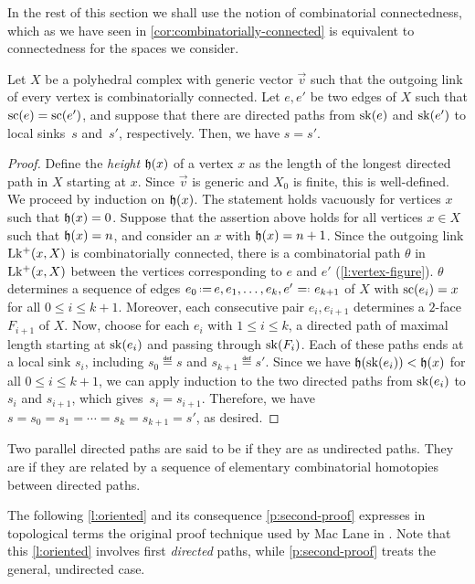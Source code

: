In the rest of this section we shall use the notion of combinatorial connectedness, which as we have seen in \cref{cor:combinatorially-connected} is equivalent to connectedness for the spaces we consider.
\begin{lemma}
    \label{l:unique-sink}
    Let $X$ be a polyhedral complex with generic vector $\vec v$ such that the outgoing link of every vertex is combinatorially connected. 
    Let $e,e'$ be two edges of $X$ such that $\mathrm{sc}(e)=\mathrm{sc}(e')$, and suppose that there are directed paths from $\mathrm{sk}(e)$ and $\mathrm{sk}(e')$ to local sinks~$s$ and~$s'$, respectively. 
    Then, we have $s=s'$.
\end{lemma}
\begin{proof}
    Define the \emph{height} $\mathfrak{h}(x)$ of a vertex $x$ as the length of the longest directed path in $X$ starting at $x$.
    Since $\vec v$ is generic and $X_0$ is finite, this is well-defined.
    We proceed by induction on $\mathfrak{h}(x)$.
    The statement holds vacuously for vertices $x$ such that $\mathfrak{h}(x)=0$.
    Suppose that the assertion above holds for all vertices $x \in X$ such that $\mathfrak{h}(x)=n$, and consider an $x$ with $\mathfrak{h}(x)=n+1$.
    Since the outgoing link $\operatorname{Lk^{+}}(x,X)$ is combinatorially connected, there is a combinatorial path $\theta$ in $\operatorname{Lk^{+}}(x,X)$ between the vertices corresponding to $e$ and $e'$ (\cref{l:vertex-figure}).
    $\theta$ determines a sequence of edges $e_0 \eqdef e, e_1, \ldots, e_k, e' \defeq e_{k+1}$ of $X$ with $\mathrm{sc}(e_i)=x$ for all $0 \leq i \leq k+1$.
    Moreover, each consecutive pair $e_i,e_{i+1}$ determines a $2$-face~$F_{i+1}$ of $X$.
    Now, choose for each $e_i$ with $1 \leq i \leq k$, a directed path of maximal length starting at $\mathrm{sk}(e_i)$ and passing through $\mathrm{sk}(F_{i})$.
    Each of these paths ends at a local sink $s_i$, including $s_0 \eqdef s$ and $s_{k+1} \eqdef s'$. 
    Since we have $\mathfrak{h}(\mathrm{sk}(e_i))<\mathfrak{h}(x)$ for all $0 \leq i \leq k+1$, we can apply induction to the two directed paths from $\mathrm{sk}(e_i)$ to $s_i$ and $s_{i+1}$, which gives~$s_i=s_{i+1}$.
    Therefore, we have $s=s_0=s_1=\cdots =s_k=s_{k+1}=s'$, as desired.
\end{proof}

Two parallel directed paths are said to be  if they are as undirected paths. 
They are  if they are related by a sequence of elementary combinatorial homotopies between directed paths. 

The following \cref{l:oriented} and its consequence \cref{p:second-proof} expresses in topological terms the original proof technique used by Mac Lane in \cite[Thm~3.1]{MacLane63}.
Note that this \cref{l:oriented} involves first \emph{directed} paths, while \cref{p:second-proof} treats the general, undirected case.

